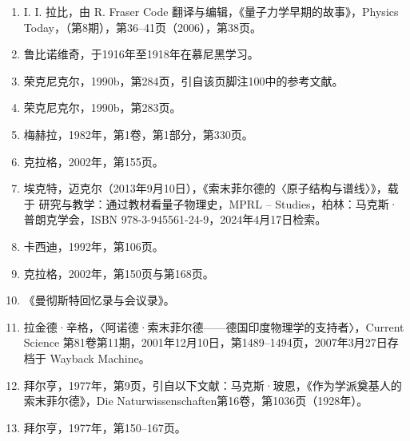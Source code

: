 \begin{enumerate}
\item I. I. 拉比，由 R. Fraser Code 翻译与编辑，《量子力学早期的故事》，Physics Today，（第8期），第36–41页（2006），第38页。
\item 鲁比诺维奇，于1916年至1918年在慕尼黑学习。
\item 荣克尼克尔，1990b，第284页，引自该页脚注100中的参考文献。
\item 荣克尼克尔，1990b，第283页。
\item 梅赫拉，1982年，第1卷，第1部分，第330页。
\item 克拉格，2002年，第155页。
\item 埃克特，迈克尔（2013年9月10日），《索末菲尔德的〈原子结构与谱线〉》，载于 研究与教学：通过教材看量子物理史，MPRL – Studies，柏林：马克斯·普朗克学会，ISBN 978-3-945561-24-9，2024年4月17日检索。
\item 卡西迪，1992年，第106页。
\item 克拉格，2002年，第150页与第168页。
\item 《曼彻斯特回忆录与会议录》。
\item 拉金德·辛格，〈阿诺德·索末菲尔德——德国印度物理学的支持者〉，Current Science 第81卷第11期，2001年12月10日，第1489–1494页，2007年3月27日存档于 Wayback Machine。
\item 拜尔亨，1977年，第9页，引自以下文献：马克斯·玻恩，《作为学派奠基人的索末菲尔德》，Die Naturwissenschaften第16卷，第1036页（1928年）。
\item 拜尔亨，1977年，第150–167页。

\end{enumerate}